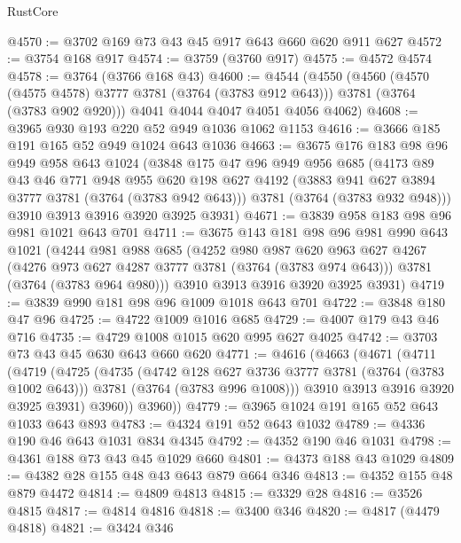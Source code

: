 \begin{lexlean}{RustCore}
\begin{coremodule}
@4570 := @3702 @169 @73 @43 @45 @917 @643 @660 @620 @911 @627
@4572 := @3754 @168 @917
@4574 := @3759 (@3760 @917)
@4575 := @4572 @4574
@4578 := @3764 (@3766 @168 @43)
@4600 := @4544
    (@4550
      (@4560
        (@4570 (@4575 @4578) @3777 @3781 (@3764 (@3783 @912 @643)))
        @3781
        (@3764 (@3783 @902 @920)))
      @4041
      @4044
      @4047
      @4051
      @4056
      @4062)
@4608 := @3965 @930 @193 @220 @52 @949 @1036 @1062 @1153
@4616 := @3666 @185 @191 @165 @52 @949 @1024 @643 @1036
@4663 := @3675
    @176
    @183
    @98
    @96
    @949
    @958
    @643
    @1024
    (@3848
      @175
      @47
      @96
      @949
      @956
      @685
      (@4173
        @89
        @43
        @46
        @771
        @948
        @955
        @620
        @198
        @627
        @4192
        (@3883 @941 @627 @3894 @3777 @3781 (@3764 (@3783 @942 @643)))
        @3781
        (@3764 (@3783 @932 @948)))
      @3910
      @3913
      @3916
      @3920
      @3925
      @3931)
@4671 := @3839 @958 @183 @98 @96 @981 @1021 @643 @701
@4711 := @3675
    @143
    @181
    @98
    @96
    @981
    @990
    @643
    @1021
    (@4244
      @981
      @988
      @685
      (@4252
        @980
        @987
        @620
        @963
        @627
        @4267
        (@4276 @973 @627 @4287 @3777 @3781 (@3764 (@3783 @974 @643)))
        @3781
        (@3764 (@3783 @964 @980)))
      @3910
      @3913
      @3916
      @3920
      @3925
      @3931)
@4719 := @3839 @990 @181 @98 @96 @1009 @1018 @643 @701
@4722 := @3848 @180 @47 @96
@4725 := @4722 @1009 @1016 @685
@4729 := @4007 @179 @43 @46 @716
@4735 := @4729 @1008 @1015 @620 @995 @627 @4025
@4742 := @3703 @73 @43 @45 @630 @643 @660 @620
@4771 := @4616
    (@4663
      (@4671
        (@4711
          (@4719
            (@4725
              (@4735
                (@4742 @128 @627 @3736 @3777 @3781 (@3764 (@3783 @1002 @643)))
                @3781
                (@3764 (@3783 @996 @1008)))
              @3910
              @3913
              @3916
              @3920
              @3925
              @3931)
            @3960))
        @3960))
@4779 := @3965 @1024 @191 @165 @52 @643 @1033 @643 @893
@4783 := @4324 @191 @52 @643 @1032
@4789 := @4336 @190 @46 @643 @1031 @834 @4345
@4792 := @4352 @190 @46 @1031
@4798 := @4361 @188 @73 @43 @45 @1029 @660
@4801 := @4373 @188 @43 @1029
@4809 := @4382 @28 @155 @48 @43 @643 @879 @664 @346
@4813 := @4352 @155 @48 @879 @4472
@4814 := @4809 @4813
@4815 := @3329 @28
@4816 := @3526 @4815
@4817 := @4814 @4816
@4818 := @3400 @346
@4820 := @4817 (@4479 @4818)
@4821 := @3424 @346

\end{coremodule}
\end{lexlean}
